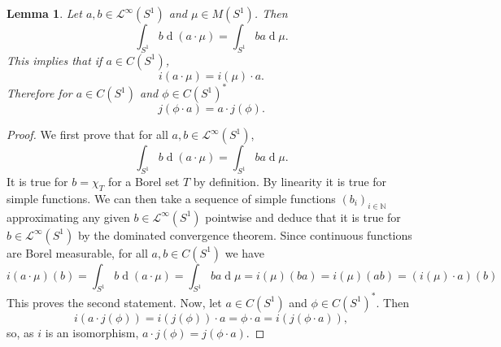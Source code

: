 \documentclass{article}
\newcommand{\Ell}{\mathcal{L}}
\renewcommand{\d}[1]{\operatorname{d}\!{#1}}
\newcommand{\N}{\ensuremath{\mathbb{N}}}
\newtheorem{lemma}[theorem]{Lemma}
\begin{document}
\begin{lemma}
\label{ModuleIsoLemma}
Let $a,b \in \Ell^\infty(S^1)$ and $\mu \in M(S^1)$. Then
\[
\int_{S^1} b \d{(a \cdot \mu)} = \int_{S^1} b a \d{\mu}.
\]
This implies that if $a \in C(S^1)$,
\[
i(a \cdot \mu) = i(\mu) \cdot a.
\]
Therefore for $a \in C(S^1)$ and $\phi \in C(S^1)^*$
\[
j(\phi \cdot a) = a \cdot j(\phi).
\]
\end{lemma}
\begin{proof}
We first prove that for all $a, b \in \Ell^\infty(S^1)$,
\[
\int_{S^1} b \d{(a \cdot \mu)} = \int_{S^1} b a \d{\mu}.
\]
It is true for $b = \chi_{T}$ for a Borel set $T$ by definition. By linearity it is true for simple functions. We can then take a sequence of simple functions $(b_i)_{i \in \N}$ approximating any given $b \in \Ell^\infty(S^1)$ pointwise and deduce that it is true for $b \in \Ell^\infty(S^1)$ by the dominated convergence theorem. Since continuous functions are Borel measurable, for all $a, b \in C(S^1)$ we have
\[
i(a \cdot \mu)(b) = \int_{S^1}b \d{(a \cdot \mu)} = \int_{S^1}ba\d{\mu} = i(\mu)(ba) = i(\mu)(ab) = (i(\mu) \cdot a)(b)
\]
This proves the second statement. Now, let $a \in C(S^1)$ and $\phi \in C(S^1)^*$. Then
\[
i(a \cdot j(\phi)) = i(j(\phi)) \cdot a = \phi \cdot a = i(j(\phi \cdot a)),
\]
so, as $i$ is an isomorphism, $a \cdot j(\phi) = j(\phi \cdot a)$. 
\end{proof}
\end{document}
